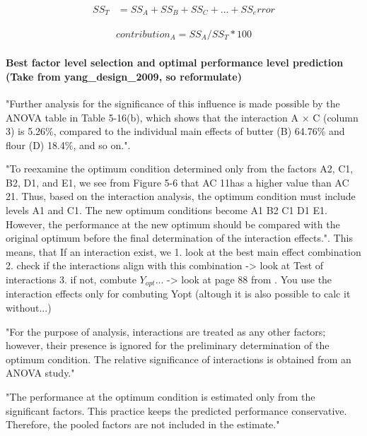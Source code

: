 \begin{equation} \label{SS_T}
	\begin{split}
		SS_T & = SS_A + SS_B + SS_C + ... + SS_error
	\end{split}
\end{equation}

\begin{equation} \label{SS_T}
	\begin{split}
		contribution_A = SS_A / SS_T * 100
	\end{split}
\end{equation}


\paragraph{Best factor level selection and optimal performance level prediction (Take from yang\_design\_2009, so reformulate)}

"Further analysis for the significance of this influence is made possible by the ANOVA table in Table 5-16(b), which shows that the interaction A × C (column 3) is 5.26\%, compared to the individual main effects of butter (B) 64.76\% and flour (D) 18.4\%, and so on."\cite{roy_primer_1990}.

"To reexamine the optimum condition determined only from the factors A2, C1, B2, D1, and E1, we see from Figure 5-6 that AC 11has a higher value than AC 21. Thus, based on the interaction analysis, the optimum condition must include levels A1 and C1. The new optimum conditions become A1 B2 C1 D1 E1. However, the performance at the new optimum should be compared with the original optimum before the final determination of the interaction effects."\cite{roy_primer_1990}.
This means, that If an interaction exist, we
1. look at the best main effect combination
2. check if the interactions align with this combination -> look at Test of interactions
3. if not, combute $Y_{opt}$... -> look at page 88 from \cite{roy_primer_1990}. You use the interaction effects only for combuting Yopt (altough it is also possible to calc it without...)

"For the purpose of analysis, interactions are treated as any other factors; however, their presence is ignored for the preliminary determination of the optimum condition. The relative significance of interactions is obtained from an ANOVA study."\cite{roy_primer_1990}


"The performance at the optimum condition is estimated only from the significant factors. This practice keeps the predicted performance conservative. Therefore, the pooled factors are not included in the estimate."\cite{roy_primer_1990}






